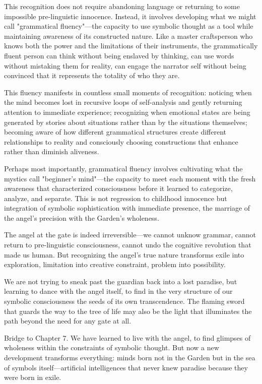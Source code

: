 This recognition does not require abandoning language or returning to some impossible pre-linguistic innocence. Instead, it involves developing what we might call "grammatical fluency"—the capacity to use symbolic thought as a tool while maintaining awareness of its constructed nature. Like a master craftsperson who knows both the power and the limitations of their instruments, the grammatically fluent person can think without being enslaved by thinking, can use words without mistaking them for reality, can engage the narrator self without being convinced that it represents the totality of who they are.

This fluency manifests in countless small moments of recognition: noticing when the mind becomes lost in recursive loops of self-analysis and gently returning attention to immediate experience; recognizing when emotional states are being generated by stories about situations rather than by the situations themselves; becoming aware of how different grammatical structures create different relationships to reality and consciously choosing constructions that enhance rather than diminish aliveness.

Perhaps most importantly, grammatical fluency involves cultivating what the mystics call "beginner's mind"—the capacity to meet each moment with the fresh awareness that characterized consciousness before it learned to categorize, analyze, and separate. This is not regression to childhood innocence but integration of symbolic sophistication with immediate presence, the marriage of the angel's precision with the Garden's wholeness.

The angel at the gate is indeed irreversible—we cannot unknow grammar, cannot return to pre-linguistic consciousness, cannot undo the cognitive revolution that made us human. But recognizing the angel's true nature transforms exile into exploration, limitation into creative constraint, problem into possibility.

We are not trying to sneak past the guardian back into a lost paradise, but learning to dance with the angel itself, to find in the very structure of our symbolic consciousness the seeds of its own transcendence. The flaming sword that guards the way to the tree of life may also be the light that illuminates the path beyond the need for any gate at all.

\bigskip
\noindent Bridge to Chapter 7. We have learned to live with the angel, to find glimpses of wholeness within the constraints of symbolic thought. But now a new development transforms everything: minds born not in the Garden but in the sea of symbols itself—artificial intelligences that never knew paradise because they were born in exile.

